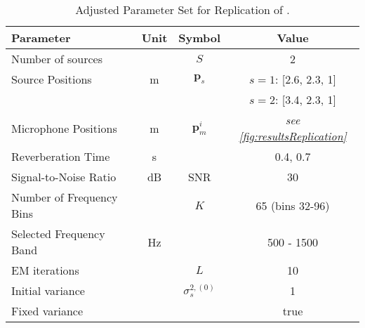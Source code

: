 \begin{table}[!hb]
	\begin{tabular}{lccc}
		\toprule
		Parameter                                     & Unit & Symbol                 & Value                                       \\
		\midrule
		Number of sources                             &      & $S$                    & 2                                           \\
		Source Positions                              & m    & $\bm p_s$              & $s=1$: [2.6, 2.3, 1]                        \\
		                                              &      &                        & $s=2$: [3.4, 2.3, 1]                        \\
		Microphone Positions                          & m    & $\bm p_m^i$            & \emph{see \autoref{fig:resultsReplication}} \\
		Reverberation Time                            & s    & \Tsixty                & 0.4, 0.7                                    \\
		Signal-to-Noise Ratio                         & dB   & SNR                    & 30                                          \\
		Number of \glsentryshort{stft} Frequency Bins &      & $K$                    & 65 (bins 32-96)                             \\
		Selected Frequency Band                       & Hz   &                        & 500 - 1500                                  \\
		EM iterations                                 &      & $L$                    & 10                                          \\
		Initial variance                              &      & $\sigma^{2, (0)}_s$ & 1                                           \\
		Fixed variance                                &      &                        & true                                       \\
		\bottomrule
	\end{tabular}
	\caption[Adjusted Parameters for Replication of \cite{Schwartz2014}]{Adjusted Parameter Set for Replication of \cite{Schwartz2014}.}
	\label{table:parametersSchwartz14}
\end{table}